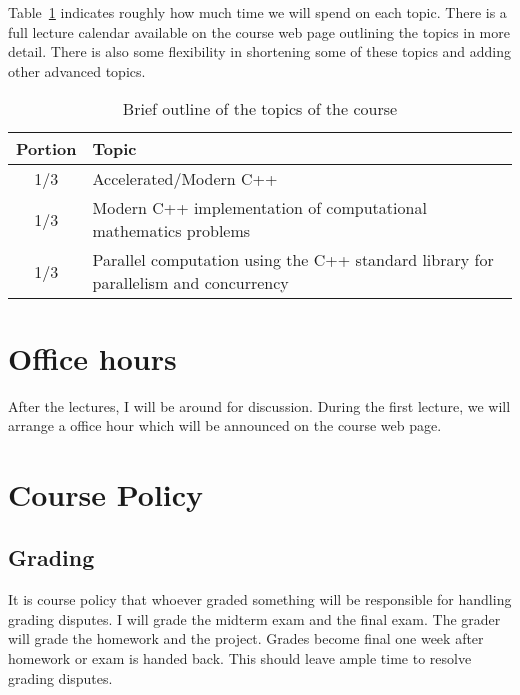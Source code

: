 \documentclass[11pt,letterpaper]{article}
\begin{document}
Table~\ref{tab:outline} indicates roughly how much time we will spend on each topic. There  is  a  full  lecture  calendar  available  on  the  course  web page  outlining  the  topics  in  more  detail. There  is  also some flexibility in shortening some of these topics and adding other advanced topics.

\begin{table}[tb]
\centering
\begin{tabular}{cl}
\hline
Portion & Topic \\
\hline
1/3 & Accelerated/Modern C++\\
1/3 & Modern C++ implementation of computational mathematics problems \\
1/3 & Parallel computation using the C++ standard library for parallelism and concurrency \\
\hline
\end{tabular}
\caption{Brief outline of the topics of the course}
\label{tab:outline}
\end{table}

\section*{Office hours}
After the lectures, I will be around for discussion. During the first lecture, we will arrange a office hour which will be announced on the course web page.

\section*{Course Policy}

\subsection*{Grading}
It is course policy that whoever graded something will be responsible for handling grading disputes. I will grade the midterm exam and the final exam. The grader will grade the homework and the project. Grades become final one week after homework or exam is handed back. This should leave ample time to resolve grading disputes.
\end{document}
